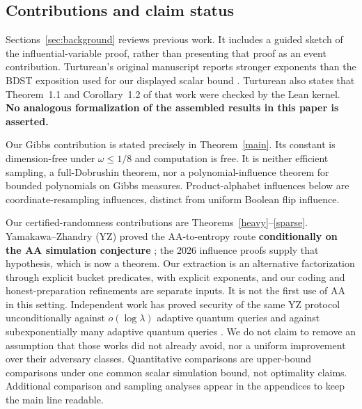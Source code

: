 \documentclass[11pt]{article}
\theoremstyle{definition}\newtheorem{definition}[theorem]{Definition}
\theoremstyle{remark}\newtheorem{remark}[theorem]{Remark}
\begin{document}
\subsection*{Contributions and claim status}
Sections~\ref{sec:background} reviews previous work. It includes a guided sketch of the influential-variable proof, rather than presenting that proof as an event contribution. Turturean's original manuscript reports stronger exponents than the BDST exposition used for our displayed scalar bound \cite{Tur26,BDST26}. Turturean also states that Theorem~1.1 and Corollary~1.2 of that work were checked by the Lean kernel. \textbf{No analogous formalization of the assembled results in this paper is asserted.}

Our Gibbs contribution is stated precisely in Theorem~\ref{main}. Its constant is dimension-free under $\omega\leq1/8$ and computation is free. It is neither efficient sampling, a full-Dobrushin theorem, nor a polynomial-influence theorem for bounded polynomials on Gibbs measures. Product-alphabet influences below are coordinate-resampling influences, distinct from uniform Boolean flip influence.

Our certified-randomness contributions are Theorems~\ref{heavy}--\ref{sparse}. Yamakawa--Zhandry (YZ) proved the AA-to-entropy route \textbf{conditionally on the AA simulation conjecture} \cite[Theorem 8.4 and Conjecture 8.1]{YZ24}; the 2026 influence proofs supply that hypothesis, which is now a theorem. Our extraction is an alternative factorization through explicit bucket predicates, with explicit exponents, and our coding and honest-preparation refinements are separate inputs. It is not the first use of AA in this setting. Independent work has proved security of the same YZ protocol unconditionally against $o(\log\lambda)$ adaptive quantum queries and against subexponentially many adaptive quantum queries \cite{KRT26,CKMRSST26}. We do not claim to remove an assumption that those works did not already avoid, nor a uniform improvement over their adversary classes. Quantitative comparisons are upper-bound comparisons under one common scalar simulation bound, not optimality claims. Additional comparison and sampling analyses appear in the appendices to keep the main line readable.








\appendix


\end{document}
